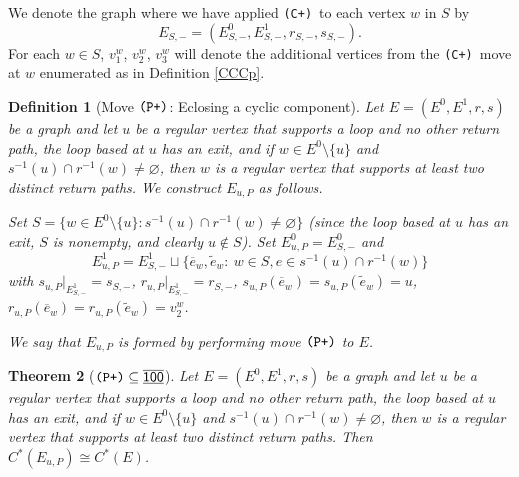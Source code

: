 \documentclass[12pt]{amsbook}%
\newtheorem{theor}{Theorem}[section]
\theoremstyle{defin}
\newtheorem{defin}[theor]{Definition}
\theoremstyle{remark}
\numberwithin{equation}{chapter}
\numberwithin{theor}{section}
\newcommand{\xyzrel}[1]{\mbox{$\overline{\underline{\mathsf{ #1}}}$}}
\newcommand{\CCCp}{\mbox{\texttt{\textup{(C+)}}}}
\newcommand{\PPPp}{\mbox{\texttt{\textup{(P+)}}}}
\renewcommand{\emptyset}{\varnothing}
\begin{document}

We denote the graph where we have applied \CCCp\ to each vertex $w$ in $S$ by \[E_{S,-}=(E_{S,-}^0,E_{S,-}^1,r_{S,-},s_{S,-}).\] For each $w\in S$, $v_1^w$, $v_2^w$, $v_3^w$ will denote the additional vertices from the \CCCp\ move at $w$ enumerated as in Definition \ref{CCCp}.

\begin{defin}[Move $\mbox{\texttt{\textup{(P+)}}}$: Eclosing a cyclic component] \label{PPPp}
Let $E=(E^0,E^1,r,s)$ be a graph and let $u$ be a regular vertex that supports a loop and no other return path, the loop based at $u$ has an exit, and if $w \in E^0 \setminus \{u\}$ and $s^{-1} (u) \cap r^{-1}(w) \neq \emptyset$, then $w$ is a regular vertex that supports at least two distinct return paths.  We construct $E_{u, P}$ as follows.  

Set $S = \{ w \in E^0 \setminus \{u\} : s^{-1}(u) \cap r^{-1}(w) \neq \emptyset \}$ (since the loop based at $u$ has an exit, $S$ is nonempty, and clearly $u \notin S$).  Set $E_{u, P}^0 = E_{S,-}^0$ and
\[
E_{u, P}^1 = E_{S,-}^1 \sqcup \{ \overline{e}_w, \tilde{e}_w  : \ w \in S, e \in s^{-1} (u) \cap r^{-1}(w) \}
\]
with $s_{{u, P}} \vert_{E_{S,-}^1} = s_{{S,-}}$, $r_{{u, P}} \vert_{E_{S,-}^1} = r_{{S,-}}$, $s_{{u, P}} ( \overline{e}_w ) = s_{{u, P}} ( \tilde{e}_w ) = u$, $r_{{u, P}} ( \overline{e}_w ) = r_{{u, P}} ( \tilde{e}_w ) = v_2^w$. %

We say that $E_{u,P}$ is formed by performing move $\mbox{\texttt{\textup{(P+)}}}$ to $E$.   
\end{defin}

\begin{theor}[$\PPPp\subseteq \xyzrel{100}$]\label{thm:iso-pulelehua+}\index{Pp@\PPPp}
Let $E=(E^0,E^1,r,s)$ be a graph  and let $u$ be a regular vertex that supports a loop and no other return path, the loop based at $u$ has an exit, and if $w \in E^0 \setminus \{u\}$ and $s^{-1} (u) \cap r^{-1}(w) \neq \emptyset$, then $w$ is a regular vertex that supports at least two distinct return paths.  Then $C^*(E_{u, P}) \cong C^*(E)$.
\end{theor}
\end{document}
